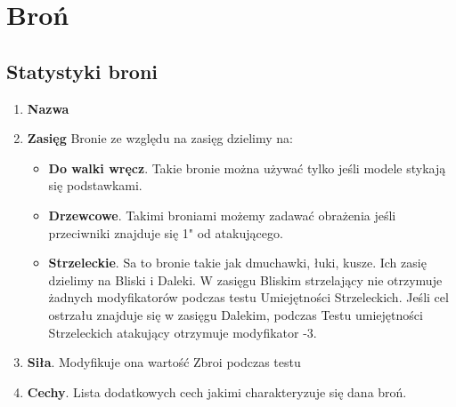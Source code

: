 \chapter{Broń}

\section{Statystyki broni}
\begin{enumerate}
    \item \textbf{Nazwa}
    \item \textbf{Zasięg}
    Bronie ze względu na zasięg dzielimy na:
    \begin{itemize}
        \item \textbf{Do walki wręcz}. Takie bronie można używać tylko jeśli modele stykają się podstawkami. 
        \item \textbf{Drzewcowe}. Takimi broniami możemy zadawać obrażenia jeśli przeciwniki znajduje się 1" od atakującego.   
        \item \textbf{Strzeleckie}. Sa to bronie takie jak dmuchawki, łuki, kusze. Ich zasię dzielimy na Bliski i Daleki. W zasięgu Bliskim strzelający nie otrzymuje żadnych modyfikatorów podczas testu Umiejętności Strzeleckich. Jeśli cel ostrzału znajduje się w zasięgu Dalekim, podczas Testu umiejętności Strzeleckich atakujący otrzymuje modyfikator -3. 
    \end{itemize}
    \item \textbf{Siła}. Modyfikuje ona wartość Zbroi podczas testu 
    \item \textbf{Cechy}. Lista dodatkowych cech jakimi charakteryzuje się dana broń. 
\end{enumerate}


